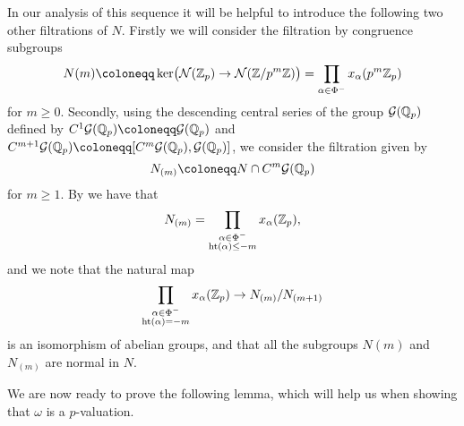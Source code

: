 In our analysis of this sequence it will be helpful to introduce the following two other filtrations of $N$. Firstly we will consider the filtration by congruence subgroups
\begin{equation}
  \label{eq:N-par-m}
  N(m) \coloneqq \ker\bigl( \gs{N}(\Z_p) \to \gs{N}(\Z/p^m\Z) \bigr) = \prod_{\alpha \in \Phi^{-}} x_\alpha(p^m\Z_p)
\end{equation}
for $m \geq 0$. Secondly, using the descending central series of the group $\mathcal{G}(\mathbb{Q}_p)$ defined by $C^1\gs{G}(\Q_p) \coloneqq \gs{G}(\Q_p)$ and $C^{m+1} \gs{G}(\Q_p) \coloneqq [C^m \gs{G}(\Q_p),\gs{G}(\Q_p)]$, we consider the filtration given by
\begin{equation*}
    N_{(m)} \coloneqq N \cap C^m \gs{G}(\Q_p)
\end{equation*}
for $m \geq 1$. By \cite[Prop.~4.7(iii)]{BT} we have that
\begin{equation}
  \label{eq:N_par-m}
  N_{(m)} = \prod_{\substack{\alpha \in \Phi^{-} \\ \operatorname{ht}(\alpha) \leq -m}} x_\alpha(\mathbb{Z}_p),
\end{equation}
and we note that the natural map
\begin{equation*}
  \prod_{\substack{\alpha\in \Phi^{-} \\ \operatorname{ht}(\alpha) = -m}} x_\alpha(\mathbb{Z}_p) \to N_{(m)}/N_{(m+1)}
\end{equation*}
is an isomorphism of abelian groups, and that all the subgroups $N(m)$ and $N_{(m)}$ are normal in $N$.

We are now ready to prove the following lemma, which will help us when showing that $\omega$ is a $p$-valuation.

